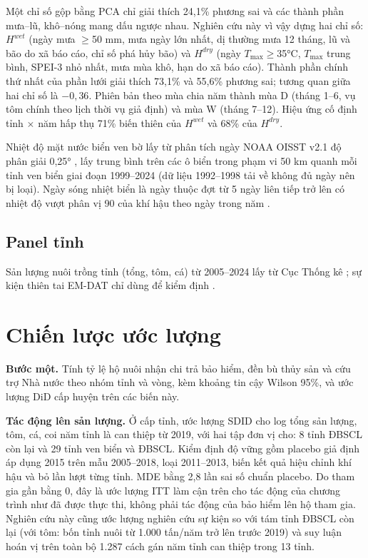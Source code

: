 \documentclass[12pt,a4paper]{article}
\begin{document}
Một chỉ số gộp bằng PCA chỉ giải thích 24,1\% phương sai và các thành phần mưa--lũ, khô--nóng mang dấu ngược nhau. Nghiên cứu này vì vậy dựng hai chỉ số: $H^{wet}$ (ngày mưa $\geq$50 mm, mưa ngày lớn nhất, dị thường mưa 12 tháng, lũ và bão do xã báo cáo, chỉ số phá hủy bão) và $H^{dry}$ (ngày $T_{\max}\geq$35°C, $T_{\max}$ trung bình, SPEI-3 nhỏ nhất, mưa mùa khô, hạn do xã báo cáo). Thành phần chính thứ nhất của phần lưới giải thích 73,1\% và 55,6\% phương sai; tương quan giữa hai chỉ số là $-0{,}36$. Phiên bản theo mùa chia năm thành mùa D (tháng 1--6, vụ tôm chính theo lịch thời vụ giả định) và mùa W (tháng 7--12). Hiệu ứng cố định tỉnh $\times$ năm hấp thụ 71\% biến thiên của $H^{wet}$ và 68\% của $H^{dry}$.

Nhiệt độ mặt nước biển ven bờ lấy từ phân tích ngày NOAA OISST v2.1 độ phân giải 0,25° \parencite{huang2021oisst}, lấy trung bình trên các ô biển trong phạm vi 50 km quanh mỗi tỉnh ven biển giai đoạn 1999--2024 (dữ liệu 1992--1998 tải về không đủ ngày nên bị loại). Ngày sóng nhiệt biển là ngày thuộc đợt từ 5 ngày liên tiếp trở lên có nhiệt độ vượt phân vị 90 của khí hậu theo ngày trong năm \parencite{hobday2016}.

\subsection{Panel tỉnh}

Sản lượng nuôi trồng tỉnh (tổng, tôm, cá) từ 2005--2024 lấy từ Cục Thống kê \parencite{nso_pxweb}; sự kiện thiên tai EM-DAT chỉ dùng để kiểm định \parencite{emdat}.

\section{Chiến lược ước lượng}
\label{sec:strategy}

\textbf{Bước một.} Tính tỷ lệ hộ nuôi nhận chi trả bảo hiểm, đền bù thủy sản và cứu trợ Nhà nước theo nhóm tỉnh và vòng, kèm khoảng tin cậy Wilson 95\%, và ước lượng DiD cấp huyện trên các biến này.

\textbf{Tác động lên sản lượng.} Ở cấp tỉnh, ước lượng SDID \parencite{arkhangelsky2021} cho log tổng sản lượng, tôm, cá, coi năm tỉnh là can thiệp từ 2019, với hai tập đơn vị cho: 8 tỉnh ĐBSCL còn lại và 29 tỉnh ven biển và ĐBSCL. Kiểm định độ vững gồm placebo giả định áp dụng 2015 trên mẫu 2005--2018, loại 2011--2013, biến kết quả hiệu chỉnh khí hậu và bỏ lần lượt từng tỉnh. MDE bằng 2,8 lần sai số chuẩn placebo. Do tham gia gần bằng 0, đây là ước lượng ITT làm cận trên cho tác động của chương trình như đã được thực thi, không phải tác động của bảo hiểm lên hộ tham gia. Nghiên cứu này cũng ước lượng nghiên cứu sự kiện so với tám tỉnh ĐBSCL còn lại (với tôm: bốn tỉnh nuôi từ 1.000 tấn/năm trở lên trước 2019) và suy luận hoán vị trên toàn bộ 1.287 cách gán năm tỉnh can thiệp trong 13 tỉnh.
\end{document}
